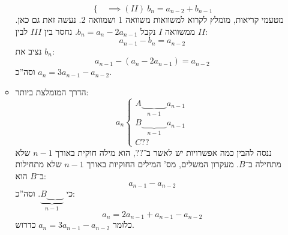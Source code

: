 \documentclass[]{article}
\begin{document}
\begin{enumerate}
\begin{itemize}
\[\begin{cases}
			\end{cases} \implies (II) \ b_n = a_{n - 2} + b_{n - 1} \]
			מטעמי קריאות, מומלץ לקרוא למשוואות משוואה 1 ושמוואה 2. נעשה זאת גם כאן. ממשוואה $I$ נקבל $b_n = a_n - 2a_{n - 1}$. נחסר בין $III$ לבין $II$: 
			\[ a_{n - 1} - b_n = a_{n - 2} \]
			נציב את $b_n$: 
			\[ a_{n - 1} - (a_n - 2a_{n - 1}) = a_{n - 2} \]
			וסה''כ $a_n = 3a_{n - 1} - a_{n - 2}$. 
			\item הדרך המומלצת ביותר: 
			\[ a_n \begin{cases}
				A\underbrace{\quad \quad \quad}_{n - 1} a_{n - 1} \\
				B\underbrace{\quad \quad \quad}_{n - 1} a_{n - 1} \\
				C ??
			\end{cases} \]
			ננסה להבין כמה אפשרויות יש לאשר ב־$??$, הוא מילה חוקית באורך $n - 1 $ שלא מתחילה ב־$B$. מעקרון המשלים, מס' המילים החוקיות באורך $n - 1$ שלא מתחילות ב־$B$ הוא: 
			\[ a_{n - 1} - a_{n - 2} \]
			כי $\underbrace{B \underbrace{\quad \quad}}_{n - 1}$. וסה''כ: 
			\[ a_n = 2a_{n - 1} + a_{n - 1} - a_{n - 2} \]
			כלומר $a_n = 3a_{n - 1} - a_{n - 2}$ כדרוש. 
		\end{itemize}
	\end{enumerate}
\end{document}
